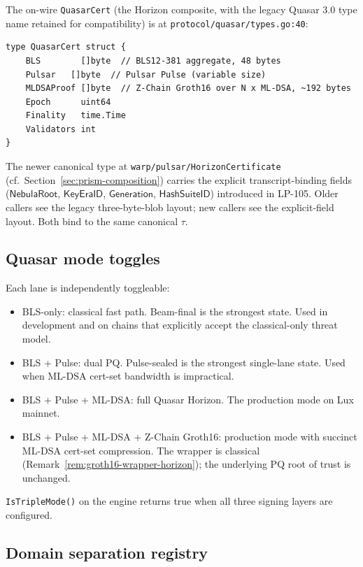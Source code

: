 The on-wire \texttt{QuasarCert} (the Horizon composite, with the legacy Quasar 3.0 type name retained for compatibility) is at \texttt{protocol/quasar/types.go:40}:

\begin{verbatim}
type QuasarCert struct {
    BLS        []byte  // BLS12-381 aggregate, 48 bytes
    Pulsar   []byte  // Pulsar Pulse (variable size)
    MLDSAProof []byte  // Z-Chain Groth16 over N x ML-DSA, ~192 bytes
    Epoch      uint64
    Finality   time.Time
    Validators int
}
\end{verbatim}

The newer canonical type at \texttt{warp/pulsar/HorizonCertificate} (cf.\ Section~\ref{sec:prism-composition}) carries the explicit transcript-binding fields ($\mathsf{NebulaRoot}$, $\mathsf{KeyEraID}$, $\mathsf{Generation}$, $\mathsf{HashSuiteID}$) introduced in LP-105. Older callers see the legacy three-byte-blob layout; new callers see the explicit-field layout. Both bind to the same canonical $\tau$.

\subsection{Quasar mode toggles}

Each lane is independently toggleable:
\begin{itemize}[leftmargin=2em,nosep]
  \item BLS-only: classical fast path. Beam-final is the strongest state. Used in development and on chains that explicitly accept the classical-only threat model.
  \item BLS + Pulse: dual PQ. Pulse-sealed is the strongest single-lane state. Used when ML-DSA cert-set bandwidth is impractical.
  \item BLS + Pulse + ML-DSA: full Quasar Horizon. The production mode on Lux mainnet.
  \item BLS + Pulse + ML-DSA + Z-Chain Groth16: production mode with succinct ML-DSA cert-set compression. The wrapper is classical (Remark~\ref{rem:groth16-wrapper-horizon}); the underlying PQ root of trust is unchanged.
\end{itemize}

\texttt{IsTripleMode()} on the engine returns true when all three signing layers are configured.

\subsection{Domain separation registry}


